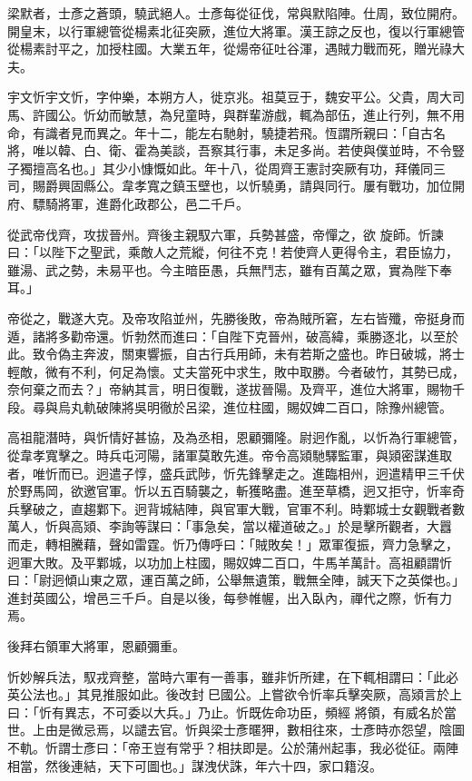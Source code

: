 \begin{pinyinscope}
 梁默者，士彥之蒼頭，驍武絕人。士彥每從征伐，常與默陷陣。仕周，致位開府。開皇末，以行軍總管從楊素北征突厥，進位大將軍。漢王諒之反也，復以行軍總管從楊素討平之，加授柱國。大業五年，從煬帝征吐谷渾，遇賊力戰而死，贈光祿大夫。



 宇文忻宇文忻，字仲樂，本朔方人，徙京兆。祖莫豆于，魏安平公。父貴，周大司馬、許國公。忻幼而敏慧，為兒童時，與群輩游戲，輒為部伍，進止行列，無不用命，有識者見而異之。年十二，能左右馳射，驍捷若飛。恆謂所親曰：「自古名將，唯以韓、白、衛、霍為美談，吾察其行事，未足多尚。若使與僕並時，不令豎子獨擅高名也。」其少小慷慨如此。年十八，從周齊王憲討突厥有功，拜儀同三司，賜爵興固縣公。韋孝寬之鎮玉壁也，以忻驍勇，請與同行。屢有戰功，加位開府、驃騎將軍，進爵化政郡公，邑二千戶。



 從武帝伐齊，攻拔晉州。齊後主親馭六軍，兵勢甚盛，帝憚之，欲
 旋師。忻諫曰：「以陛下之聖武，乘敵人之荒縱，何往不克！若使齊人更得令主，君臣協力，雖湯、武之勢，未易平也。今主暗臣愚，兵無鬥志，雖有百萬之眾，實為陛下奉耳。」



 帝從之，戰遂大克。及帝攻陷並州，先勝後敗，帝為賊所窘，左右皆殲，帝挺身而遁，諸將多勸帝還。忻勃然而進曰：「自陛下克晉州，破高緯，乘勝逐北，以至於此。致令偽主奔波，關東響振，自古行兵用師，未有若斯之盛也。昨日破城，將士輕敵，微有不利，何足為懷。丈夫當死中求生，敗中取勝。今者破竹，其勢已成，奈何棄之而去？」帝納其言，明日復戰，遂拔晉陽。及齊平，進位大將軍，賜物千
 段。尋與烏丸軌破陳將吳明徹於呂梁，進位柱國，賜奴婢二百口，除豫州總管。



 高祖龍潛時，與忻情好甚協，及為丞相，恩顧彌隆。尉迥作亂，以忻為行軍總管，從韋孝寬擊之。時兵屯河陽，諸軍莫敢先進。帝令高熲馳驛監軍，與熲密謀進取者，唯忻而已。迥遣子惇，盛兵武陟，忻先鋒擊走之。進臨相州，迥遣精甲三千伏於野馬岡，欲邀官軍。忻以五百騎襲之，斬獲略盡。進至草橋，迥又拒守，忻率奇兵擊破之，直趨鄴下。迥背城結陣，與官軍大戰，官軍不利。時鄴城士女觀戰者數萬人，忻與高熲、李詢等謀曰：「事急矣，當以權道破之。」於是擊所觀者，大囂
 而走，轉相騰藉，聲如雷霆。忻乃傳呼曰：「賊敗矣！」眾軍復振，齊力急擊之，迥軍大敗。及平鄴城，以功加上柱國，賜奴婢二百口，牛馬羊萬計。高祖顧謂忻曰：「尉迥傾山東之眾，運百萬之師，公舉無遺策，戰無全陣，誠天下之英傑也。」進封英國公，增邑三千戶。自是以後，每參帷幄，出入臥內，禪代之際，忻有力焉。



 後拜右領軍大將軍，恩顧彌重。



 忻妙解兵法，馭戎齊整，當時六軍有一善事，雖非忻所建，在下輒相謂曰：「此必英公法也。」其見推服如此。後改封巳國公。上嘗欲令忻率兵擊突厥，高熲言於上曰：「忻有異志，不可委以大兵。」乃止。忻既佐命功臣，頻經
 將領，有威名於當世。上由是微忌焉，以譴去官。忻與梁士彥暱狎，數相往來，士彥時亦怨望，陰圖不軌。忻謂士彥曰：「帝王豈有常乎？相扶即是。公於蒲州起事，我必從征。兩陣相當，然後連結，天下可圖也。」謀洩伏誅，年六十四，家口籍沒。




\end{pinyinscope}
